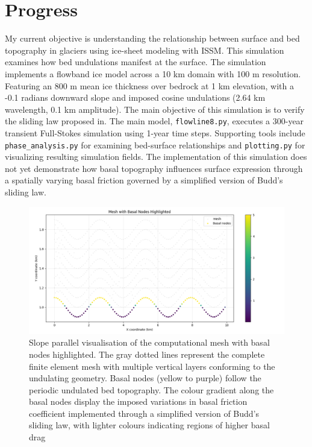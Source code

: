 \chapter{Progress}

My current objective is understanding the relationship between surface and bed topography in glaciers using ice-sheet modeling with ISSM. This simulation examines how bed undulations manifest at the surface. The simulation implements a flowband ice model across a 10 km domain with 100 m resolution. Featuring an 800 m mean ice thickness over bedrock at 1 km elevation, with a -0.1 radians downward slope and imposed cosine undulations (2.64 km wavelength, 0.1 km amplitude). The main objective of this simulation is to verify the sliding law proposed in\cite{Budd_1970}. The main model, \texttt{flowline8.py}, executes a 300-year transient Full-Stokes simulation using 1-year time steps. Supporting tools include \texttt{phase\_analysis.py} for examining bed-surface relationships and \texttt{plotting.py} for visualizing resulting simulation fields. The implementation of this simulation does not yet demonstrate how basal topography influences surface expression through a spatially varying basal friction governed by a simplified version of Budd's sliding law.

\begin{figure}[H]
    \includegraphics[scale=0.5]{basal_friction.png}
    \caption{Slope parallel visualisation of the computational mesh with basal nodes highlighted. The gray dotted lines represent the complete finite element mesh with multiple vertical layers conforming to the undulating geometry. Basal nodes (yellow to purple) follow the periodic undulated bed topography. The colour gradient along the basal nodes display the imposed variations in basal friction coefficient implemented through a simplified version of Budd's sliding law, with lighter colours indicating regions of higher basal drag}
    \label{fig:Friction}
\end{figure}


